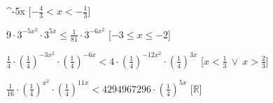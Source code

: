 \begin{esercizio}
\begin{enumeratea}
^{{-5x}}\)
   \hfill [\(-\frac{4}{3} < x < -\frac{1}{3}\)]
  \item  \(9 \cdot 3^{{-5x^2}} \cdot 3^{{5x}} \leqslant \frac{1}{81} \cdot 
3^{{-6x^2}}\)
   \hfill [\(-3 \leqslant x \leqslant -2\)]
  \item  \(\frac{1}{4} \cdot \left(\frac{1}{4}\right)^{{-3x^2}} \cdot 
\left(\frac{1}{4}\right)^{{-6x}} < 4 \cdot \left(\frac{1}{4}\right)^{{-12x^2}} 
\cdot \left(\frac{1}{4}\right)^{{3x}}\)
   \hfill [\(x < \frac{1}{3}~\vee~x > \frac{2}{3}\)]
  \item  \(\frac{1}{16} \cdot \left(\frac{1}{4}\right)^{{x^2}} \cdot 
\left(\frac{1}{4}\right)^{{11x}} < 4294967296 \cdot 
\left(\frac{1}{4}\right)^{{5x}}\)
   \hfill [\(\mathbb{R}\)]
 \end{enumeratea}
\end{esercizio}


